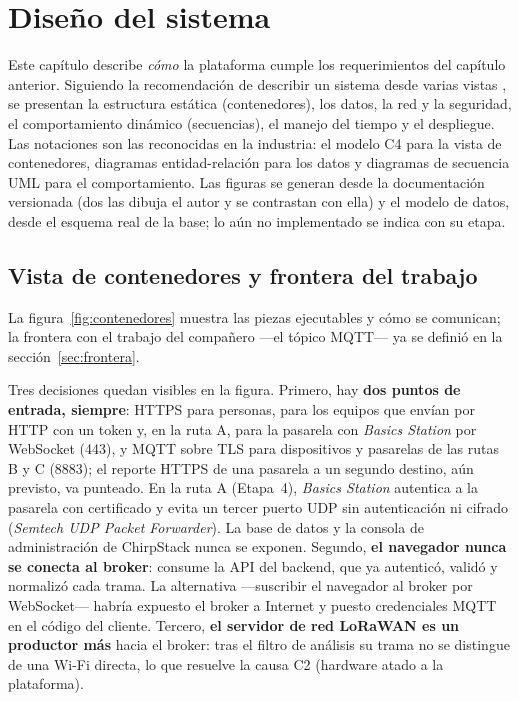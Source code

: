 \chapter[Diseño del sistema]{Diseño del sistema}
\label{cap:diseno}

Este capítulo describe \emph{cómo} la plataforma cumple los requerimientos del capítulo anterior.
Siguiendo la recomendación de describir un sistema desde varias vistas \parencite{iso42010}, se presentan la estructura
estática (contenedores), los datos, la red y la seguridad, el comportamiento dinámico (secuencias),
el manejo del tiempo y el despliegue. Las notaciones son las reconocidas en la industria: el modelo
C4 \parencite{c4brown} para la vista de contenedores, diagramas entidad-relación \parencite{chen1976}
para los datos y diagramas de secuencia UML \parencite{uml251} para el comportamiento. Las figuras se generan desde la documentación versionada (dos las dibuja el autor y se contrastan con ella) y el modelo de datos, desde el esquema real de la base; lo aún no implementado se indica con su etapa.

\section{Vista de contenedores y frontera del trabajo}

La figura~\ref{fig:contenedores} muestra las piezas ejecutables y cómo se comunican; la frontera con
el trabajo del compañero —el tópico MQTT— ya se definió en la sección~\ref{sec:frontera}.



Tres decisiones quedan visibles en la figura. Primero, hay \textbf{dos puntos de entrada, siempre}: HTTPS para personas, para los
equipos que envían por HTTP con un token y, en la ruta A, para la pasarela con \emph{Basics Station} por WebSocket (443), y MQTT sobre
TLS para dispositivos y pasarelas de las rutas B y C (8883); el reporte HTTPS de una pasarela a un segundo destino, aún previsto, va punteado. En la ruta A (Etapa~4), \emph{Basics Station} autentica a la pasarela con certificado y evita un tercer puerto UDP sin autenticación ni cifrado (\emph{Semtech UDP Packet Forwarder}). La base de datos y la
consola de administración de ChirpStack nunca se exponen. Segundo, \textbf{el navegador nunca se conecta al
broker}: consume la API del backend, que ya autenticó, validó y normalizó cada trama. La alternativa
—suscribir el navegador al broker por WebSocket— habría expuesto el broker a Internet y puesto
credenciales MQTT en el código del cliente. Tercero, \textbf{el servidor de red LoRaWAN es un productor más} hacia el broker: tras el filtro de análisis su trama no se distingue de una Wi-Fi directa, lo que resuelve la causa C2 (hardware atado a la plataforma).

